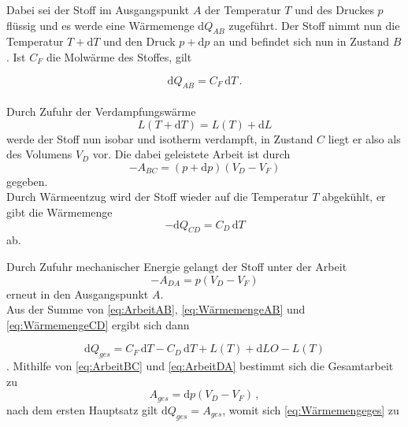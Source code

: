 Dabei sei der Stoff im Ausgangspunkt $A$ der Temperatur $T$ und des Druckes $p$ flüssig und es werde eine Wärmemenge $\mathrm{d}Q_{AB}$ zugeführt.
Der Stoff nimmt nun die Temperatur $T + \mathrm{d}T$ und den Druck $p + \mathrm{d}p$ an und befindet sich nun in Zustand $B$.
Ist $C_F$ die Molwärme des Stoffes, gilt

\begin{equation}
    \mathrm{d}Q_{AB} = C_F \, \mathrm{d}T \,.
    \label{eq:ArbeitAB}
\end{equation}\\

Durch Zufuhr der Verdampfungswärme
\begin{equation}
    L(T + \mathrm{d}T) = L(T) + \mathrm{d}L
    \label{eq:WärmemengeAB}
\end{equation}
werde der Stoff nun isobar und isotherm verdampft, in Zustand $C$ liegt er also als des Volumens $V_D$ vor.
Die dabei geleistete Arbeit ist durch
\begin{equation}
    -A_{BC} = (p + \mathrm{d}p)(V_D - V_F)
    \label{eq:ArbeitBC}
\end{equation}
gegeben. \\

Durch Wärmeentzug wird der Stoff wieder auf die Temperatur $T$ abgekühlt, er gibt die Wärmemenge
\begin{equation}
    -\mathrm{d}Q_{CD} = C_D \,\mathrm{d}T
    \label{eq:WärmemengeCD}
\end{equation}
ab.

Durch Zufuhr mechanischer Energie gelangt der Stoff unter der Arbeit
\begin{equation}
    -A_{DA} = p (V_D - V_F)
    \label{eq:ArbeitDA}
\end{equation} 
erneut in den Ausgangspunkt $A$. \\

Aus der Summe von \eqref{eq:ArbeitAB}, \eqref{eq:WärmemengeAB} und \eqref{eq:WärmemengeCD} ergibt sich dann

\begin{equation}
    \mathrm{d}Q_{ges} = C_F \, \mathrm{d}T - C_D \, \mathrm{d}T + L(T) + \mathrm{d}LO - L(T)
    \label{eq:Wärmemengeges}
\end{equation}.
Mithilfe von \eqref{eq:ArbeitBC} und \eqref{eq:ArbeitDA} bestimmt sich die Gesamtarbeit zu
\begin{equation}
    A_{ges} = \mathrm{d}p (V_D - V_F) \,,
\end{equation} nach dem ersten Hauptsatz gilt $\mathrm{d}Q_{ges} = A_{ges}$, womit sich \eqref{eq:Wärmemengeges} zu 

